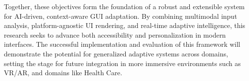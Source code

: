 \documentclass[openany]{book}
\begin{document}
Together, these objectives form the foundation of a robust and extensible system for AI-driven, context-aware GUI adaptation. By combining multimodal input analysis, platform-agnostic UI rendering, and real-time adaptive intelligence, this research seeks to advance both accessibility and personalization in modern interfaces. The successful implementation and evaluation of this framework will demonstrate the potential for generalized adaptive systems across domains, setting the stage for future integration in more immersive environments such as VR/AR, and domains like Health Care.

% 
\newpage 
\end{document}
